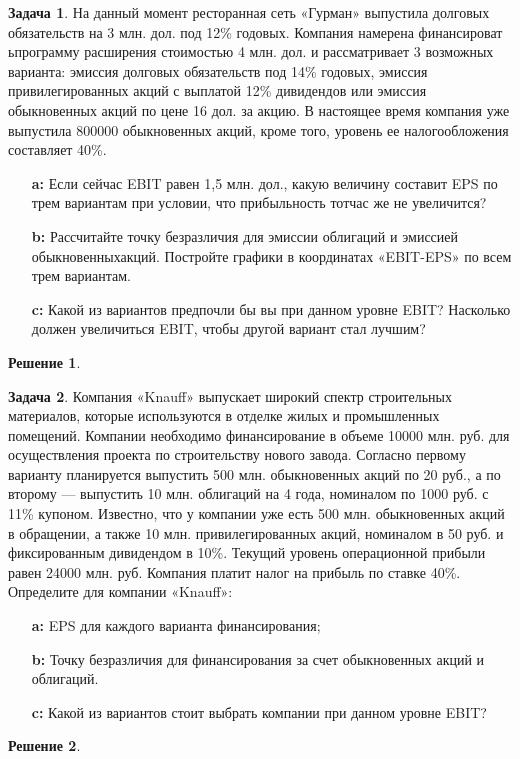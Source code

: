 \documentclass[a4paper, 14pt]{article}
\theoremstyle{plain} %
\theoremstyle{definition} %
\newtheorem*{solution}{Решение}
\newtheorem{problem}{Задача}[subsection]
\theoremstyle{remark} %
\begin{document}
\begin{problem}
	На данный момент ресторанная сеть «Гурман» выпустила долговых обязательств на 3 млн.  дол.  под  12\%  годовых.  Компания намерена финансироват ьпрограмму расширения стоимостью   4   млн.   дол.   и рассматривает   3   возможных варианта:   эмиссия долговых обязательств под   14\%   годовых,   эмиссия привилегированных акций с выплатой   12\% дивидендов или эмиссия обыкновенных акций по цене 16 дол. за акцию. В настоящее время компания уже выпустила    800000    обыкновенных акций,    кроме того,    уровень ее налогообложения составляет 40\%.
	\begin{itemize}
		\item[\textbf{a:}] Если сейчас EBIT равен  1,5  млн.  дол.,  какую величину составит EPS по трем вариантам при условии, что прибыльность тотчас же не увеличится?
		\item[\textbf{b:}] Рассчитайте точку безразличия для эмиссии облигаций и эмиссией обыкновенныхакций. Постройте графики в координатах «EBIT-EPS» по всем трем вариантам.
		\item[\textbf{c:}] Какой из вариантов предпочли бы вы при данном уровне EBIT? Насколько должен увеличиться EBIT, чтобы другой вариант стал лучшим?
	\end{itemize}
	\begin{solution}

	\end{solution}
\end{problem}

\begin{problem}
	Компания  «Knauff»  выпускает широкий спектр строительных материалов,  которые используются в отделке жилых и промышленных помещений. Компании необходимо финансирование в объеме  10000  млн.  руб.  для осуществления проекта по строительству нового завода. Согласно первому варианту планируется выпустить  500  млн.  обыкновенных акций по 20 руб., а по второму --- выпустить 10 млн. облигаций на 4 года, номиналом по 1000 руб. с 11\% купоном. Известно, что у компании уже есть 500 млн. обыкновенных акций в обращении, а также 10 млн. привилегированных акций, номиналом в 50 руб. и фиксированным дивидендом в 10\%. Текущий уровень операционной прибыли равен 24000 млн. руб. Компания платит налог на прибыль по ставке 40\%. Определите для компании «Knauff»:
	\begin{itemize}
		\item[\textbf{a:}] EPS для каждого варианта финансирования;
		\item[\textbf{b:}] Точку безразличия для финансирования за счет обыкновенных акций и облигаций.
		\item[\textbf{c:}] Какой из вариантов стоит выбрать компании при данном уровне EBIT?
	\end{itemize}
	\begin{solution}

	\end{solution}
\end{problem}
\end{document}
